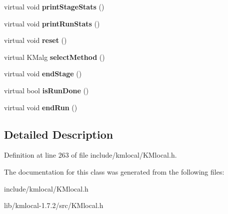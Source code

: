 \begin{DoxyCompactItemize}
\item 
\hypertarget{class_k_mlocal_lloyds_a1f814731cc3c15a197c8ba9071c7fb7a}{
virtual void {\bfseries printStageStats} ()}
\label{class_k_mlocal_lloyds_a1f814731cc3c15a197c8ba9071c7fb7a}

\item 
\hypertarget{class_k_mlocal_lloyds_a9505a5cf770b6bb630b54155d4a80069}{
virtual void {\bfseries printRunStats} ()}
\label{class_k_mlocal_lloyds_a9505a5cf770b6bb630b54155d4a80069}

\item 
\hypertarget{class_k_mlocal_lloyds_a1632443f11db8230f24d9f0fd260bfe3}{
virtual void {\bfseries reset} ()}
\label{class_k_mlocal_lloyds_a1632443f11db8230f24d9f0fd260bfe3}

\item 
\hypertarget{class_k_mlocal_lloyds_a990427f7b10dc1b5dbcf71e775caa958}{
virtual KMalg {\bfseries selectMethod} ()}
\label{class_k_mlocal_lloyds_a990427f7b10dc1b5dbcf71e775caa958}

\item 
\hypertarget{class_k_mlocal_lloyds_afc989e8c7bf9ed9a1bf439701f15aaab}{
virtual void {\bfseries endStage} ()}
\label{class_k_mlocal_lloyds_afc989e8c7bf9ed9a1bf439701f15aaab}

\item 
\hypertarget{class_k_mlocal_lloyds_a3e78b5eefa4c37fa7da109230197de67}{
virtual bool {\bfseries isRunDone} ()}
\label{class_k_mlocal_lloyds_a3e78b5eefa4c37fa7da109230197de67}

\item 
\hypertarget{class_k_mlocal_lloyds_a6bf5a283a6530596ebec1081f082588d}{
virtual void {\bfseries endRun} ()}
\label{class_k_mlocal_lloyds_a6bf5a283a6530596ebec1081f082588d}

\end{DoxyCompactItemize}


\subsection{Detailed Description}


Definition at line 263 of file include/kmlocal/KMlocal.h.



The documentation for this class was generated from the following files:\begin{DoxyCompactItemize}
\item 
include/kmlocal/KMlocal.h\item 
lib/kmlocal-\/1.7.2/src/KMlocal.h\end{DoxyCompactItemize}
